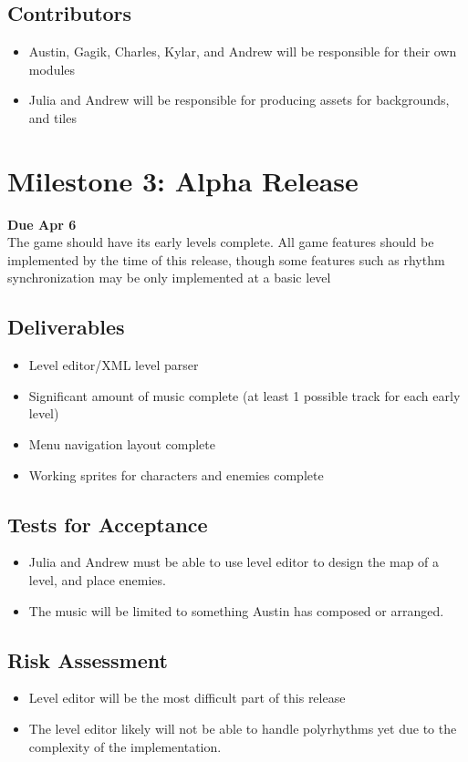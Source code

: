 \documentclass[]{article}
\begin{document}
\subsection*{Contributors}
\begin{itemize}
\item Austin, Gagik, Charles, Kylar, and Andrew will be responsible for 
  their own modules
\item Julia and Andrew will be responsible for producing assets for 
  backgrounds, and tiles
\end{itemize}

\pagebreak
\section*{Milestone 3: Alpha Release}
\noindent\textbf{Due Apr 6}\\
The game should have its early levels complete.
All game features should be implemented by the time of this release,
though some features such as rhythm synchronization may be only
implemented at a basic level
\subsection*{Deliverables}
\begin{itemize}
\item Level editor/XML level parser
\item Significant amount of music complete (at least 1 possible track 
  for each early level)
\item Menu navigation layout complete
\item Working sprites for characters and enemies complete
\end{itemize}
\subsection*{Tests for Acceptance}
\begin{itemize}
\item Julia and Andrew must be able to use level editor to design the map 
  of a level, and place enemies. 
\item The music will be limited to something Austin has composed or arranged.
\end{itemize}
\subsection*{Risk Assessment}
\begin{itemize}
\item Level editor will be the most difficult part of this release
\item The level editor likely will not be able to handle polyrhythms 
  yet due to the complexity of the implementation.
\end{itemize}
\end{document}
